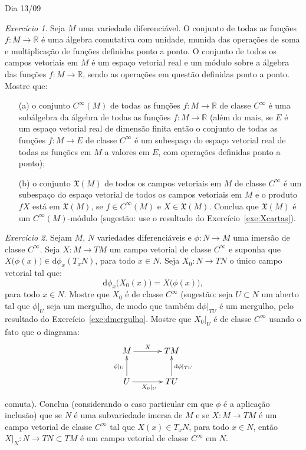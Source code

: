 \documentclass[oneside,11pt]{amsart}
\newcommand{\R}{\mathds R}
\newcommand{\dd}{\mathrm d}
\theoremstyle{remark}\newtheorem{exercise}{Exercício}[section]
\theoremstyle{plain}\newtheorem{teo}{Teorema}[section]
\theoremstyle{plain}\newtheorem{lem}[teo]{Lema}
\theoremstyle{plain}\newtheorem{prop}[teo]{Proposição}
\theoremstyle{definition}\newtheorem{defin}[teo]{Definição}
\theoremstyle{remark}\newtheorem{rem}[teo]{Observação}
\theoremstyle{definition}\newtheorem{example}[teo]{Exemplo}
\numberwithin{equation}{section}
\begin{document}
\begin{section}{Dia 13/09}
\begin{exercise}\label{exe:XMCMmodulo}
Seja $M$ uma variedade diferenciável. O conjunto de todas as funções $f:M\to\R$ é uma álgebra comutativa com unidade, munida das operações
de soma e multiplicação de funções definidas ponto a ponto. O conjunto de todos os campos vetoriais em $M$ é um espaço vetorial real e um módulo
sobre a álgebra das funções $f:M\to\R$, sendo as operações em questão definidas ponto a ponto. Mostre que:
\begin{itemize}
\item[(a)] o conjunto $C^\infty(M)$ de todas as funções $f:M\to\R$ de classe $C^\infty$ é uma subálgebra da álgebra de todas
as funções $f:M\to\R$ (além do mais, se $E$ é um espaço vetorial real de dimensão finita então o conjunto de todas as funções $f:M\to E$
de classe $C^\infty$ é um subespaço do espaço vetorial real de todas as funções em $M$ a valores em $E$, com operações definidas ponto a ponto);
\item[(b)] o conjunto $\mathfrak X(M)$ de todos os campos vetoriais em $M$ de classe $C^\infty$ é um subespaço do espaço vetorial de todos os campos
vetoriais em $M$ e o produto $fX$ está em $\mathfrak X(M)$, se $f\in C^\infty(M)$ e $X\in\mathfrak X(M)$. Conclua que $\mathfrak X(M)$ é um $C^\infty(M)$-módulo
(sugestão: use o resultado do Exercício~\ref{exe:Xcartas}).
\end{itemize}
\end{exercise}

\begin{exercise}\label{exe:restrcampoimersa}
Sejam $M$, $N$ variedades diferenciáveis e $\phi:N\to M$ uma imersão de classe $C^\infty$. Seja $X:M\to TM$ um campo vetorial de classe $C^\infty$ e suponha que
$X\big(\phi(x)\big)\in\dd\phi_x(T_xN)$, para todo $x\in N$. Seja $X_0:N\to TN$ o único campo vetorial tal que:
\[\dd\phi_x\big(X_0(x)\big)=X\big(\phi(x)\big),\]
para todo $x\in N$. Mostre que $X_0$ é de classe $C^\infty$ (sugestão: seja $U\subset N$ um aberto tal que $\phi\vert_U$ seja um mergulho, de modo que
também $\dd\phi\vert_{TU}$ é um mergulho, pelo resultado do Exercício~\ref{exe:dmergulho}. Mostre que $X_0\vert_U$ é de classe $C^\infty$ usando o fato que o diagrama:
\[\xymatrix@C+10pt{%
M\ar[r]^-X&TM\\
U\ar[u]^{\phi\vert_U}\ar[r]_{X_0\vert_U}&TU\ar[u]_{\dd\phi\vert_{TU}}}\]
comuta). Conclua (considerando o caso particular em que $\phi$ é a aplicação inclusão)
que se $N$ é uma subvariedade imersa de $M$ e se $X:M\to TM$ é um campo vetorial de classe $C^\infty$ tal que $X(x)\in T_xN$, para todo $x\in N$,
então $X\vert_N:N\to TN\subset TM$ é um campo vetorial de classe $C^\infty$ em $N$.
\end{exercise}

\end{section}
\end{document}
